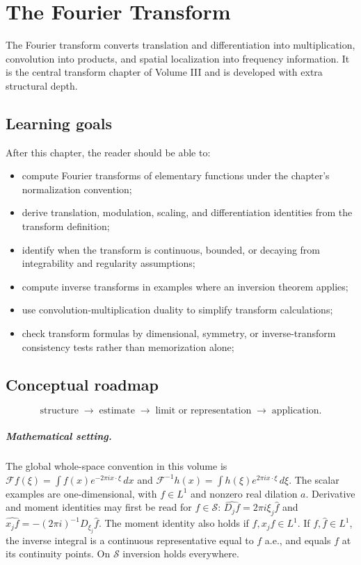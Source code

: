 \chapter{The Fourier Transform}
\label{ch:iii11}

The Fourier transform converts translation and differentiation into multiplication, convolution into products, and spatial localization into frequency information. It is the central transform chapter of Volume III and is developed with extra structural depth.

\section*{Learning goals}
After this chapter, the reader should be able to:
\begin{itemize}
\item compute Fourier transforms of elementary functions under the chapter's normalization convention;
\item derive translation, modulation, scaling, and differentiation identities from the transform definition;
\item identify when the transform is continuous, bounded, or decaying from integrability and regularity assumptions;
\item compute inverse transforms in examples where an inversion theorem applies;
\item use convolution-multiplication duality to simplify transform calculations;
\item check transform formulas by dimensional, symmetry, or inverse-transform consistency tests rather than memorization alone;
\end{itemize}
\section*{Conceptual roadmap}
\[
\boxed{\text{structure}\;\longrightarrow\;\text{estimate}\;\longrightarrow\;\text{limit or representation}\;\longrightarrow\;\text{application}.}
\]

\paragraph{Mathematical setting.}
The global whole-space convention in this volume is $\mathcal Ff(\xi)=\int f(x)e^{-2\pi ix\cdot\xi}\,dx$ and $\mathcal F^{-1}h(x)=\int h(\xi)e^{2\pi ix\cdot\xi}\,d\xi$. The scalar examples are one-dimensional, with $f\in L^1$ and nonzero real dilation $a$. Derivative and moment identities may first be read for $f\in\mathcal S$: $\widehat{D_jf}=2\pi i\xi_j\widehat f$ and $\widehat{x_jf}=-(2\pi i)^{-1}D_{\xi_j}\widehat f$. The moment identity also holds if $f,x_jf\in L^1$. If $f,\widehat f\in L^1$, the inverse integral is a continuous representative equal to $f$ a.e., and equals $f$ at its continuity points. On $\mathcal S$ inversion holds everywhere.

